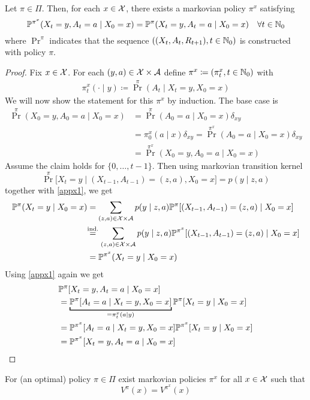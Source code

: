 \begin{prop}
	Let \(\pi\in\Pi\). Then, for each \(x\in\mathcal{X}\), there exists a markovian policy \(\pi^{x}\) satisfying
	\[\mathbb{P}^{\pi^x}(X_t=y,A_t=a\mid X_0=x)=\mathbb{P}^\pi(X_t=y,A_t=a\mid X_0=x)\quad \forall t\in\mathbb{N}_0 \]
	where \(\Pr^\pi\) indicates that the sequence 
	\(((X_t, A_t, R_{t+1}),t\in\mathbb{N}_0 )\) is constructed with policy \(\pi\).
\end{prop}
\begin{proof}
	Fix \(x\in\mathcal{X}\). For each \((y,a)\in\mathcal{X}\times\mathcal{A}\) define \(\pi^x\coloneqq (\pi^x_t,t\in\mathbb{N}_0)\) with
 	\begin{align}
			\pi^x_t(\cdot\mid y)\coloneqq \Pr^\pi (A_t \mid X_t=y,X_0=x)
	\end{align}
	We will now show the statement for this \(\pi^x\) by induction. The base case is
	\begin{align*}
		\Pr^\pi(X_0=y,A_0=a\mid X_0=x) 
		&= \Pr^\pi(A_0=a\mid X_0=x)\delta_{xy}\\
		&=\pi^x_0(a\mid x)\delta_{xy} 
		= \Pr^{\pi^x}(A_0=a\mid X_0=x)\delta_{xy}\\
		&=\Pr^{\pi^x}(X_0=y, A_0=a\mid X_0=x)
	\end{align*}
	Assume the claim holds for \(\{0,\dots, t-1\}\). Then using markovian transition kernel
	\[\Pr^\pi\big[X_t=y\mid (X_{t-1},A_{t-1})=(z,a), X_0=x\big]=p(y\mid z,a)\]
	together with \ref{appx1}, we get
	\begin{align*}
		\Pr^\pi(X_t=y\mid X_0=x)
		&=\sum_{(z,a)\in\cX\times\cA}p(y\mid z,a)
		\Pr^\pi[(X_{t-1},A_{t-1})=(z,a)\mid X_0=x]\\
		&\lxeq{\text{ind.}} \sum_{(z,a)\in\cX\times\cA}p(y\mid z,a)
		\Pr^{\pi^x}[(X_{t-1},A_{t-1})=(z,a)\mid X_0=x]\\
		&=\Pr^{\pi^x}(X_t=y\mid X_0=x)
	\end{align*}
	Using \ref{appx1} again we get
	\begin{align*}
		&\Pr^{\pi}[X_t=y, A_t=a \mid X_0=x]\\
		&=\underbracket[1pt]{\Pr^\pi[A_t=a \mid X_t=y, X_0=x]}_{=\pi^x_t(a\mid y)}
		\Pr^\pi[X_t=y\mid X_0=x]\\
		&=\Pr^{\pi^x}[A_t=a \mid X_t=y, X_0=x]\Pr^{\pi^x}[X_t=y\mid X_0=x]\\
		&=\Pr^{\pi^x}[X_t=y, A_t=a \mid X_0=x]\qedhere
	\end{align*}
\end{proof}
\begin{corollary}
	For (an optimal) policy \(\pi\in\Pi\) exist markovian policies \(\pi^x\) for all \(x\in\mathcal{X}\) such that
	\[
		V^\pi(x)=V^{\pi^x}(x)	
	\]
\end{corollary}
